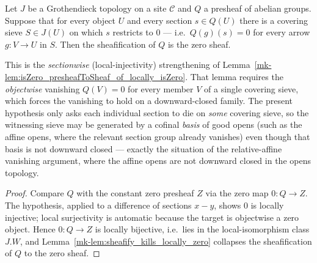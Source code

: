 \begin{lemma}\label{mk-lem:isZero_presheafToSheaf_of_sections_locally_zero}
  \leanok

  Let \(J\) be a Grothendieck topology on a site \(\mathcal{C}\) and \(Q\) a presheaf of
  abelian groups. Suppose that for every object \(U\) and every section \(s \in Q(U)\) there
  is a covering sieve \(S \in J(U)\) on which \(s\) restricts to \(0\) --- i.e.\ \(Q(g)(s) =
  0\) for every arrow \(g : V \to U\) in \(S\). Then the sheafification of \(Q\) is the zero
  sheaf.

  This is the \emph{sectionwise} (local-injectivity) strengthening of
  Lemma~\ref{mk-lem:isZero_presheafToSheaf_of_locally_isZero}. That lemma requires the
  \emph{objectwise} vanishing \(Q(V) = 0\) for every member \(V\) of a single covering sieve,
  which forces the vanishing to hold on a downward-closed family. The present hypothesis only
  asks each individual section to die on \emph{some} covering sieve, so the witnessing sieve
  may be generated by a cofinal \emph{basis} of good opens (such as the affine opens, where
  the relevant section group already vanishes) even though that basis is not downward closed
  --- exactly the situation of the relative-affine vanishing argument, where the affine opens
  are not downward closed in the opens topology.
\end{lemma}
\begin{proof}
  \leanok
  Compare \(Q\) with the constant zero presheaf \(Z\) via the zero map \(0 : Q \to Z\). The
  hypothesis, applied to a difference of sections \(x - y\), shows \(0\) is locally injective;
  local surjectivity is automatic because the target is objectwise a zero object. Hence \(0 :
  Q \to Z\) is locally bijective, i.e.\ lies in the local-isomorphism class \(J.W\), and
  Lemma~\ref{mk-lem:sheafify_kills_locally_zero} collapses the sheafification of \(Q\) to the
  zero sheaf.
\end{proof}

